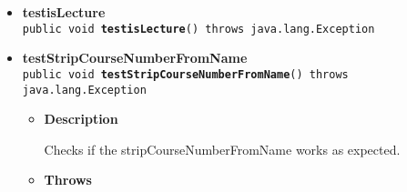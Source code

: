 \documentclass[11pt,a4paper]{report}
\begin{document}
{{{\begin{itemize}
{\begin{itemize}
{Tests if the conversion from Date to Calendar preserves the actual date/time
}
\item{{\bf  Throws}
}%
\end{itemize}
}%
\item{ 
{\bf  testisLecture}\\
\texttt{public void\ {\bf  testisLecture}() throws java.lang.Exception
\label{is.mpg.ruglan.test.UtilsTest.testisLecture()}}%
}%
\item{ 
{\bf  testStripCourseNumberFromName}\\
\texttt{public void\ {\bf  testStripCourseNumberFromName}() throws java.lang.Exception
\label{is.mpg.ruglan.test.UtilsTest.testStripCourseNumberFromName()}}%
\begin{itemize}
\item{
{\bf  Description}

Checks if the stripCourseNumberFromName works as expected.
}
\item{{\bf  Throws}
}%
\end{itemize}
}%
\end{itemize}
}
}
}
\end{document}
